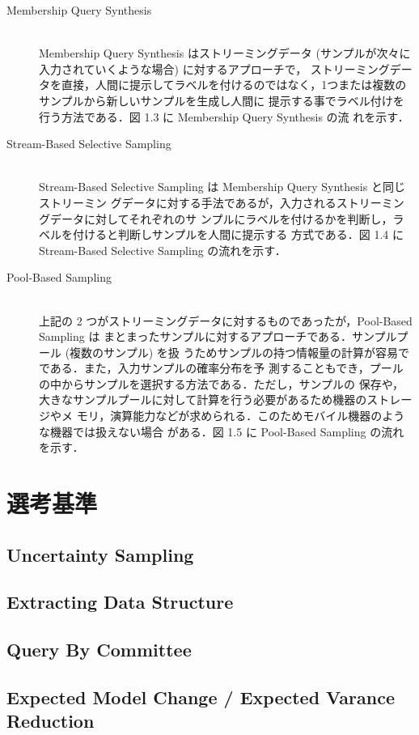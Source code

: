 \begin{description}
    \item[Membership Query Synthesis]\mbox{}\\ 
        Membership Query Synthesis はストリーミングデータ (サンプルが次々に入力されていくような場合) に対するアプローチで，
        ストリーミングデータを直接，人間に提示してラベルを付けるのではなく，1つまたは複数のサンプルから新しいサンプルを生成し人間に
        提示する事でラベル付けを行う方法である．図 1.3 に Membership Query Synthesis の流
        れを示す．
    \item[Stream-Based Selective Sampling]\mbox{}\\
        Stream-Based Selective Sampling は Membership Query Synthesis と同じストリーミン
        グデータに対する手法であるが，入力されるストリーミングデータに対してそれぞれのサ
        ンプルにラベルを付けるかを判断し，ラベルを付けると判断しサンプルを人間に提示する
        方式である．図 1.4 に Stream-Based Selective Sampling の流れを示す．
    \item[Pool-Based Sampling]\mbox{}\\
        上記の 2 つがストリーミングデータに対するものであったが，Pool-Based Sampling は
        まとまったサンプルに対するアプローチである．サンプルプール (複数のサンプル) を扱
        うためサンプルの持つ情報量の計算が容易でである．また，入力サンプルの確率分布を予
        測することもでき，プールの中からサンプルを選択する方法である．ただし，サンプルの
        保存や，大きなサンプルプールに対して計算を行う必要があるため機器のストレージやメ
        モリ，演算能力などが求められる．このためモバイル機器のような機器では扱えない場合
        がある．図 1.5 に Pool-Based Sampling の流れを示す．
\end{description}

\section{選考基準}

\subsection{Uncertainty Sampling}
\subsection{Extracting Data Structure}
\subsection{Query By Committee}
\subsection{Expected Model Change / Expected Varance Reduction}


